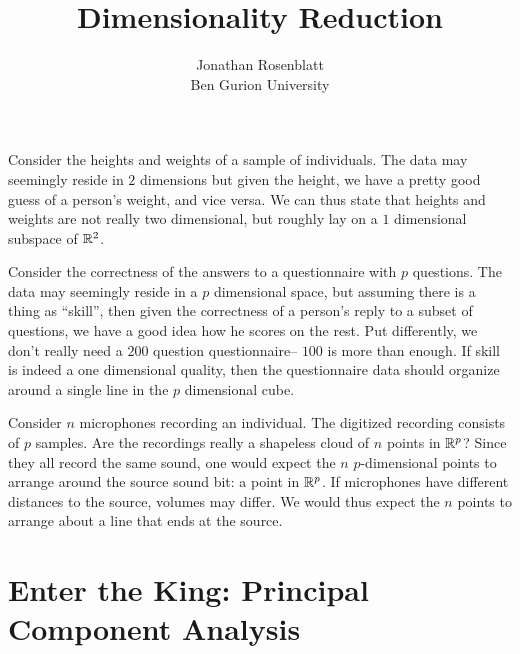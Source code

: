 \documentclass[12pt,a4paper]{article}
\author{Jonathan Rosenblatt \\ Ben Gurion University}
\title{Dimensionality Reduction}
\begin{document}
\maketitle

\tableofcontents

\hrulefill

\begin{example}[BMI]
	\label{ex:bmi}
	Consider the heights and weights of a sample of individuals. 
	The data may seemingly reside in $2$ dimensions but given the height, we have a pretty good guess of a person's weight, and vice versa. 
	We can thus state that heights and weights are not really two dimensional, but roughly lay on a $1$ dimensional subspace of $\mathbb{R}^2$. 
\end{example}


\begin{example}[g-factor]
	\label{ex:iq}
	Consider the correctness of the answers to a questionnaire with $p$ questions. 
	The data may seemingly reside in a $p$ dimensional space, but assuming there is a thing as ``skill'', then given the correctness of a person's reply to a subset of questions, we have a good idea how he scores on the rest. 
	Put differently, we don't really need a $200$ question questionnaire-- $100$ is more than enough.
	If skill is indeed a one dimensional quality, then the questionnaire data should organize around a single line in the $p$ dimensional cube. 
\end{example}



\begin{example}
	\label{ex:blind-signal}
	Consider $n$ microphones recording an individual. 
	The digitized recording consists of $p$ samples. 
	Are the recordings really a shapeless cloud of $n$ points in $\mathbb{R}^p$?
	Since they all record the same sound, one would expect the $n$ $p$-dimensional points to arrange around the source sound bit: a point in $\mathbb{R}^p$.
	If microphones have different distances to the source, volumes may differ. 
	We would thus expect the $n$ points to arrange about a line that ends at the source. 	
\end{example}
		
	






\section{Enter the King: Principal Component Analysis}
\label{sec:pca}
\end{document}
